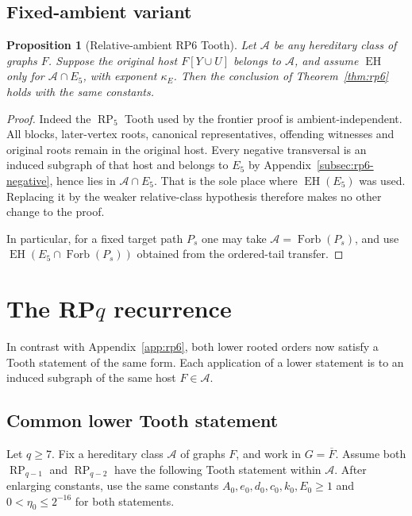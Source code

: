 \documentclass[11pt,a4paper]{article}
\newtheorem{proposition}[theorem]{Proposition}
\theoremstyle{definition}
\theoremstyle{remark}
\numberwithin{equation}{section}
\DeclareMathOperator{\RP}{RP}
\begin{document}
\subsection{Fixed-ambient variant}\label{subsec:rp6-relative}
\begin{proposition}[Relative-ambient RP6 Tooth]\label{prop:rp6-relative}
Let \(\mathcal A\) be any hereditary class of graphs \(F\). Suppose the original host \(F[Y \cup  U]\) belongs to \(\mathcal A\), and assume \(\operatorname{EH}\) only for \(\mathcal A\cap  E_{5}\), with exponent \(\kappa_{E}\). Then the conclusion of Theorem~\ref{thm:rp6} holds with the same constants.
\end{proposition}
\begin{proof}
Indeed the \(\operatorname{RP}_{5}\) Tooth used by the frontier proof is ambient-independent. All blocks, later-vertex roots, canonical representatives, offending witnesses and original roots remain in the original host. Every negative transversal is an induced subgraph of that host and belongs to \(E_{5}\) by Appendix~\ref{subsec:rp6-negative}, hence lies in \(\mathcal A\cap  E_{5}\). That is the sole place where \(\operatorname{EH}(E_{5})\) was used. Replacing it by the weaker relative-class hypothesis therefore makes no other change to the proof.

In particular, for a fixed target path \(P_{s}\) one may take \(\mathcal A=\operatorname{Forb}(P_{s})\), and use \(\operatorname{EH}(E_{5} \cap  \operatorname{Forb}(P_{s}))\) obtained from the ordered-tail transfer.
\end{proof}

\section{The \texorpdfstring{RP\(q\)}{RPq} recurrence}\label{app:rpq}

In contrast with Appendix~\ref{app:rp6}, both lower rooted orders now satisfy a Tooth statement of the same form. Each application of a lower statement is to an induced subgraph of the same host \(F\in\mathcal A\).

\subsection{Common lower Tooth statement}\label{subsec:rpq-lower}
Let \(q\ge\allowbreak 7\). Fix a hereditary class \(\mathcal A\) of graphs \(F\), and work in \(G=\overline{F}\). Assume both \(\RP_{q-1}\) and \(\RP_{q-2}\) have the following Tooth statement within \(\mathcal A\). After enlarging constants, use the same constants \(A_{0},\allowbreak e_{0},\allowbreak d_{0},\allowbreak c_{0},\allowbreak k_{0},\allowbreak E_{0} \ge\allowbreak 1\) and \(0<\eta_{0}\le\allowbreak 2^{-16}\) for both statements.
\end{document}

